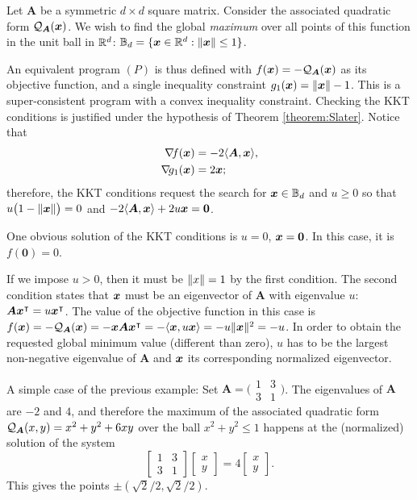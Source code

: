 \begin{example}
Let $\boldsymbol{A}$ be a symmetric $d \times d$ square matrix.  Consider the associated quadratic form $\mathcal{Q}_{\boldsymbol{A}}(\boldsymbol{x})$.  We wish to find the global \emph{maximum} over all points of this function in the unit ball in $\mathbb{R}^d$: $\mathbb{B}_d = \{ \boldsymbol{x} \in \mathbb{R}^d : \lVert \boldsymbol{x} \rVert \leq 1 \}$.

An equivalent program $(P)$ is thus defined with $f(\boldsymbol{x}) = -\mathcal{Q}_{\boldsymbol{A}}(\boldsymbol{x})$ as its objective function, and a single inequality constraint $g_1(\boldsymbol{x}) = \lVert \boldsymbol{x} \rVert-1$.  This is a super-consistent program with a convex inequality constraint.  Checking the KKT conditions is justified under the hypothesis of Theorem \ref{theorem:Slater}.  Notice that 
\begin{align*}
\mathop{\nabla\! {f}}(\boldsymbol{x}) &= -2 \langle \boldsymbol{A}, \boldsymbol{x} \rangle, \\
\mathop{\nabla\! {g_1}}(\boldsymbol{x}) &= 2\boldsymbol{x};
\end{align*}
therefore, the KKT conditions request the search for $\boldsymbol{x} \in \mathbb{B}_d$ and $u \geq 0$ so that $u\big(1-\lVert \boldsymbol{x} \rVert\big)=0$ and $-2\langle \boldsymbol{A}, \boldsymbol{x} \rangle + 2u\boldsymbol{x} = \boldsymbol{0}$.  

One obvious solution of the KKT conditions is $u=0$, $\boldsymbol{x}=\boldsymbol{0}$.  In this case, it is $f(\boldsymbol{0})=0$.

If we impose $u>0$, then it must be $\lVert x \rVert=1$ by the first condition.  The second condition states that $\boldsymbol{x}$ must be an eigenvector of $\boldsymbol{A}$ with eigenvalue $u$: $\boldsymbol{A} {\boldsymbol{x}}^\intercal = u {\boldsymbol{x}}^\intercal$.  The value of the objective function in this case is $f(\boldsymbol{x}) = -\mathcal{Q}_{\boldsymbol{A}}(\boldsymbol{x}) = -\boldsymbol{x} \boldsymbol{A} {\boldsymbol{x}}^\intercal = -\langle \boldsymbol{x}, u\boldsymbol{x} \rangle = -u \lVert \boldsymbol{x} \rVert^2= -u$.  In order to obtain the requested global minimum value (different than zero), $u$ has to be the largest non-negative eigenvalue of $\boldsymbol{A}$ and $\boldsymbol{x}$ its corresponding normalized eigenvector.
\end{example}

\begin{example}
A simple case of the previous example: Set $\boldsymbol{A} = \big( \begin{smallmatrix} 1 & 3 \\ 3 & 1 \end{smallmatrix}\big)$.  The eigenvalues of $\boldsymbol{A}$ are $-2$ and $4$, and therefore the maximum of the associated quadratic form $\mathcal{Q}_{\boldsymbol{A}}(x,y) = x^2+y^2+6xy$ over the ball $x^2+y^2\leq 1$ happens at the (normalized) solution of the system
\begin{equation*}
\begin{bmatrix} 1 & 3 \\ 3 & 1 \end{bmatrix} \begin{bmatrix} x \\ y \end{bmatrix} = 4\begin{bmatrix} x \\ y \end{bmatrix}.
\end{equation*}
This gives the points $\pm(\sqrt{2}/2, \sqrt{2}/2)$.
\end{example}